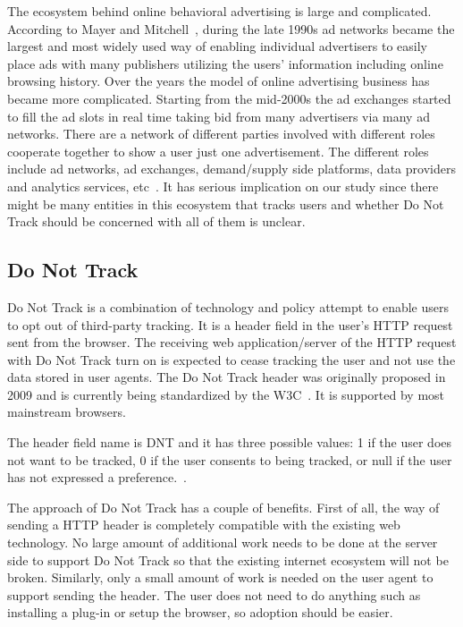\documentclass{sig-alternate}
\begin{document}
The ecosystem behind online behavioral advertising is large and complicated. According to Mayer and Mitchell~\cite{mayer2012third}, during the late 1990s ad networks became the largest and most widely used way of enabling individual advertisers to easily place ads with many publishers utilizing the users' information including online browsing history. Over the years the model of online advertising business has became more complicated. Starting from the mid-2000s the ad exchanges started to fill the ad slots in real time taking bid from many advertisers via many ad networks. There are a network of different parties involved with different roles cooperate together to show a user just one advertisement. The different roles include ad networks, ad exchanges, demand/supply side platforms, data providers and analytics services, etc~\cite{mayer2012third}. It has serious implication on our study since there might be many entities in this ecosystem that tracks users and whether Do Not Track should be concerned with all of them is unclear.

\subsection*{Do Not Track}

Do Not Track is a combination of technology and policy attempt to enable users to opt out of third-party tracking. It is a header field in the user’s HTTP request sent from the browser. The receiving web application/server of the HTTP request with Do Not Track turn on is expected to cease tracking the user and not use the data stored in user agents. The Do Not Track header was originally proposed in 2009 and is currently being standardized by the W3C~\cite{wikidnt}. It is supported by most mainstream browsers. 

The header field name is DNT and it has three possible values: 1 if the user does not want to be tracked, 0 if the user consents to being tracked, or null if the user has not expressed a preference.~\cite{wikidnt}. 

The approach of Do Not Track has a couple of benefits. First of all, the way of sending a HTTP header is completely compatible with the existing web technology. No large amount of additional work needs to be done at the server side to support Do Not Track so that the existing internet ecosystem will not be broken. Similarly, only a small amount of work is needed on the user agent to support sending the header. The user does not need to do anything such as installing a plug-in or setup the browser, so adoption should be easier.
\end{document}
